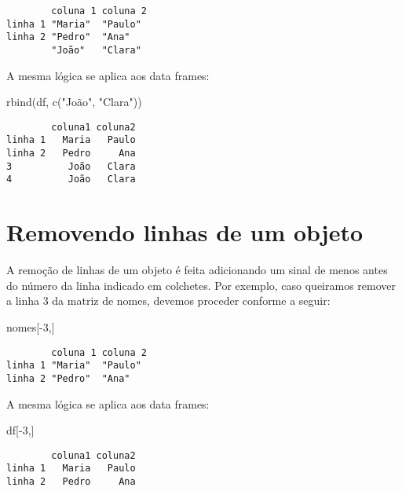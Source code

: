 \documentclass[
  letterpaper,
  DIV=11,
  numbers=noendperiod]{scrreprt}
\newenvironment{Shaded}{\begin{snugshade}}{\end{snugshade}}
\newcommand{\DecValTok}[1]{\textcolor[rgb]{0.68,0.00,0.00}{#1}}
\newcommand{\FunctionTok}[1]{\textcolor[rgb]{0.28,0.35,0.67}{#1}}
\newcommand{\NormalTok}[1]{\textcolor[rgb]{0.00,0.23,0.31}{#1}}
\newcommand{\SpecialCharTok}[1]{\textcolor[rgb]{0.37,0.37,0.37}{#1}}
\newcommand{\StringTok}[1]{\textcolor[rgb]{0.13,0.47,0.30}{#1}}
\begin{document}
\begin{verbatim}
        coluna 1 coluna 2
linha 1 "Maria"  "Paulo" 
linha 2 "Pedro"  "Ana"   
        "João"   "Clara" 
\end{verbatim}

A mesma lógica se aplica aos data frames:

\begin{Shaded}
\begin{Highlighting}[]
\FunctionTok{rbind}\NormalTok{(df, }\FunctionTok{c}\NormalTok{(}\StringTok{"João"}\NormalTok{, }\StringTok{"Clara"}\NormalTok{))}
\end{Highlighting}
\end{Shaded}

\begin{verbatim}
        coluna1 coluna2
linha 1   Maria   Paulo
linha 2   Pedro     Ana
3          João   Clara
4          João   Clara
\end{verbatim}

\section{Removendo linhas de um
objeto}\label{removendo-linhas-de-um-objeto}

A remoção de linhas de um objeto é feita adicionando um sinal de menos
antes do número da linha indicado em colchetes. Por exemplo, caso
queiramos remover a linha 3 da matriz de nomes, devemos proceder
conforme a seguir:

\begin{Shaded}
\begin{Highlighting}[]
\NormalTok{nomes[}\SpecialCharTok{{-}}\DecValTok{3}\NormalTok{,]}
\end{Highlighting}
\end{Shaded}

\begin{verbatim}
        coluna 1 coluna 2
linha 1 "Maria"  "Paulo" 
linha 2 "Pedro"  "Ana"   
\end{verbatim}

A mesma lógica se aplica aos data frames:

\begin{Shaded}
\begin{Highlighting}[]
\NormalTok{df[}\SpecialCharTok{{-}}\DecValTok{3}\NormalTok{,]}
\end{Highlighting}
\end{Shaded}

\begin{verbatim}
        coluna1 coluna2
linha 1   Maria   Paulo
linha 2   Pedro     Ana
\end{verbatim}
\end{document}
